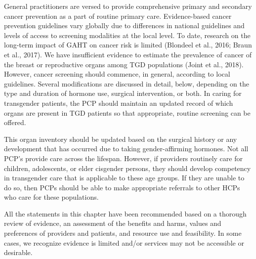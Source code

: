 \documentclass[
]{book}
\begin{document}
General practitioners are versed to provide comprehensive primary and secondary cancer prevention as a part of routine primary care.
Evidence-based cancer prevention guidelines
vary globally due to differences in national
guidelines and levels of access to screening
modalities at the local level. To date, research
on the long-term impact of GAHT on cancer
risk is limited (Blondeel et al., 2016; Braun
et al., 2017). We have insufficient evidence to
estimate the prevalence of cancer of the breast
or reproductive organs among TGD populations
(Joint et al., 2018). However, cancer screening
should commence, in general, according to local
guidelines. Several modifications are discussed
in detail, below, depending on the type and
duration of hormone use, surgical intervention,
or both. In caring for transgender patients, the
PCP should maintain an updated record of
which organs are present in TGD patients so
that appropriate, routine screening can be
offered.

This organ inventory should be updated based
on the surgical history or any development that
has occurred due to taking gender-affirming hormones. Not all PCP's provide care across the
lifespan. However, if providers routinely care for
children, adolescents, or elder cisgender persons,
they should develop competency in transgender
care that is applicable to these age groups. If they
are unable to do so, then PCPs should be able
to make appropriate referrals to other HCPs who
care for these populations.

All the statements in this chapter have been
recommended based on a thorough review of
evidence, an assessment of the benefits and
harms, values and preferences of providers and
patients, and resource use and feasibility. In
some cases, we recognize evidence is limited
and/or services may not be accessible or
desirable.
\end{document}
